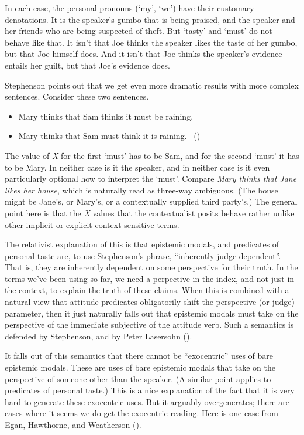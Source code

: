 \documentclass[
  11pt,
  letterpaper,
  DIV=11,
  numbers=noendperiod,
  twoside]{scrartcl}
\providecommand{\tightlist}{%
  \setlength{\itemsep}{0pt}\setlength{\parskip}{0pt}}
\begin{document}
In each case, the personal pronouns (`my', `we') have their customary
denotations. It is the speaker's gumbo that is being praised, and the
speaker and her friends who are being suspected of theft. But `tasty'
and `must' do not behave like that. It isn't that Joe thinks the speaker
likes the taste of her gumbo, but that Joe himself does. And it isn't
that Joe thinks the speaker's evidence entails her guilt, but that Joe's
evidence does.

Stephenson points out that we get even more dramatic results with more
complex sentences. Consider these two sentences.

\begin{itemize}
\tightlist
\item
  Mary thinks that Sam thinks it must be raining.
\item
  Mary thinks that Sam must think it is raining.
  ~()
\end{itemize}

The value of \emph{X} for the first `must' has to be Sam, and for the
second `must' it has to be Mary. In neither case is it the speaker, and
in neither case is it even particularly optional how to interpret the
`must'. Compare \emph{Mary thinks that Jane likes her house}, which is
naturally read as three-way ambiguous. (The house might be Jane's, or
Mary's, or a contextually supplied third party's.) The general point
here is that the \emph{X} values that the contextualist posits behave
rather unlike other implicit or explicit context-sensitive terms.

The relativist explanation of this is that epistemic modals, and
predicates of personal taste are, to use Stephenson's phrase,
``inherently judge-dependent''. That is, they are inherently dependent
on some perspective for their truth. In the terms we've been using so
far, we need a perpective in the index, and not just in the context, to
explain the truth of these claims. When this is combined with a natural
view that attitude predicates obligatorily shift the perspective (or
judge) parameter, then it just naturally falls out that epistemic modals
must take on the perspective of the immediate subjective of the attitude
verb. Such a semantics is defended by Stephenson, and by Peter Lasersohn
().

It falls out of this semantics that there cannot be ``exocentric'' uses
of bare epistemic modals. These are uses of bare epistemic modals that
take on the perspective of someone other than the speaker. (A similar
point applies to predicates of personal taste.) This is a nice
explanation of the fact that it is very hard to generate these
exocentric uses. But it arguably overgenerates; there are cases where it
seems we do get the exocentric reading. Here is one case from Egan,
Hawthorne, and Weatherson ().
\end{document}
